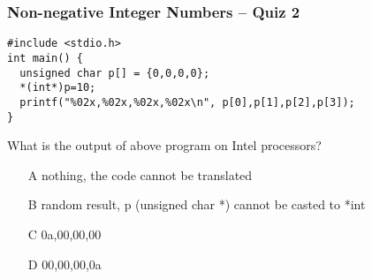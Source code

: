 \documentclass{beamer}
\begin{document}
\begin{frame}[fragile]
\frametitle{Non-negative Integer Numbers -- Quiz 2}
\begin{verbatim}
#include <stdio.h>
int main() {
  unsigned char p[] = {0,0,0,0};
  *(int*)p=10;
  printf("%02x,%02x,%02x,%02x\n", p[0],p[1],p[2],p[3]);
}
\end{verbatim}

What is the output of above program on Intel processors?
\begin{itemize}
\item[A] nothing, the code cannot be translated
\item[B] random result, p (unsigned char *) cannot be casted to *int
\item[C] 0a,00,00,00 
\item[D] 00,00,00,0a
\end{itemize}
\end{frame}
\end{document}
